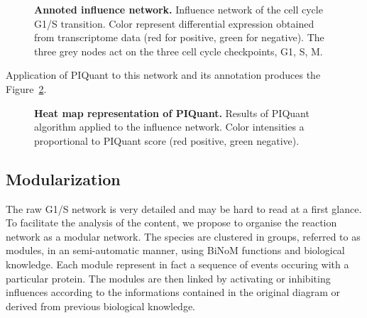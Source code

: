 \documentclass[10pt]{bmc_article}
\newenvironment{bmcformat}{\baselineskip20pt\sloppy\setboolean{publ}{false}}{\baselineskip20pt\sloppy}
\begin{document}
\begin{bmcformat}
\begin{figure}[h]
  \caption{\label{InflAnnotNet} \textbf{Annoted influence network.}
    Influence network of the cell cycle G1/S transition. Color represent differential
expression obtained from transcriptome data (red for positive, green for
negative). The three grey nodes act on the three cell cycle checkpoints, G1, S,
M.}
\end{figure}

Application of PIQuant to this network and its annotation produces the Figure~\ref{PIQuantHeatMap}.

\begin{figure}[h]
  \caption{\label{PIQuantHeatMap} \textbf{Heat map representation of PIQuant.}
    Results of PIQuant algorithm applied to the influence network. Color intensities a proportional to PIQuant score (red positive, green negative).}
\end{figure}



\subsection*{Modularization} 

The raw G1/S network is very detailed and may be hard to read at a first glance.
To facilitate the analysis of the content, we propose to organise the reaction
network as a modular network. The species are clustered in groups, referred to
as modules, in an semi-automatic manner, using BiNoM functions and biological knowledge. Each module represent in fact a
sequence of events occuring with a particular protein. The modules are then
linked by activating or inhibiting influences according to the informations
contained in the original diagram or derived from previous biological knowledge.


\end{bmcformat}
\end{document}
